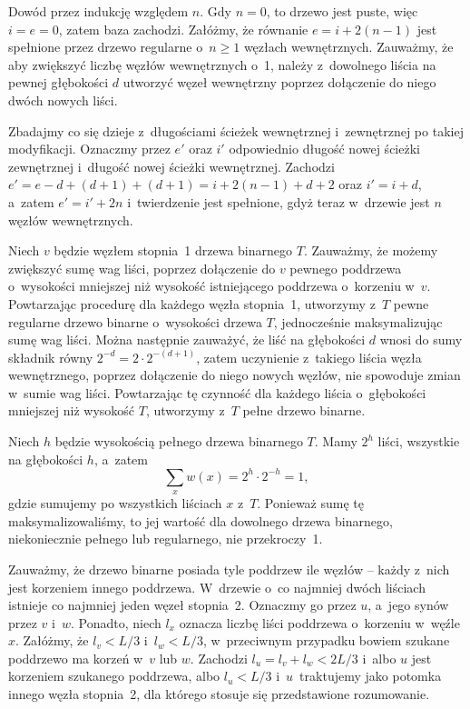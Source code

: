 \exercise %
Dowód przez indukcję względem $n$. Gdy $n=0$, to drzewo jest puste, więc $i=e=0$, zatem baza zachodzi. Załóżmy, że równanie $e=i+2(n-1)$ jest spełnione przez drzewo regularne o~$n\ge1$ węzłach wewnętrznych. Zauważmy, że aby zwiększyć liczbę węzłów wewnętrznych o~1, należy z~dowolnego liścia na pewnej głębokości $d$ utworzyć węzeł wewnętrzny poprzez dołączenie do niego dwóch nowych liści.

Zbadajmy co się dzieje z~długościami ścieżek wewnętrznej i~zewnętrznej po takiej modyfikacji. Oznaczmy przez $e'$ oraz $i'$ odpowiednio długość nowej ścieżki zewnętrznej i~długość nowej ścieżki wewnętrznej. Zachodzi $e'=e-d+(d+1)+(d+1)=i+2(n-1)+d+2$ oraz $i'=i+d$, a~zatem $e'=i'+2n$ i~twierdzenie jest spełnione, gdyż teraz w~drzewie jest $n$ węzłów wewnętrznych.

\exercise %
Niech $v$ będzie węzłem stopnia~1 drzewa binarnego $T$. Zauważmy, że możemy zwiększyć sumę wag liści, poprzez dołączenie do $v$ pewnego poddrzewa o~wysokości mniejszej niż wysokość istniejącego poddrzewa o~korzeniu w~$v$. Powtarzając procedurę dla każdego węzła stopnia~1, utworzymy z~$T$ pewne regularne drzewo binarne o~wysokości drzewa $T$, jednocześnie maksymalizując sumę wag liści. Można następnie zauważyć, że liść na głębokości $d$ wnosi do sumy składnik równy $2^{-d}=2\cdot2^{-(d+1)}$, zatem uczynienie z~takiego liścia węzła wewnętrznego, poprzez dołączenie do niego nowych węzłów, nie spowoduje zmian w~sumie wag liści. Powtarzając tę czynność dla każdego liścia o~głębokości mniejszej niż wysokość $T$, utworzymy z~$T$ pełne drzewo binarne.

Niech $h$ będzie wysokością pełnego drzewa binarnego $T$. Mamy $2^h$ liści, wszystkie na głębokości $h$, a~zatem
\[
	\sum_{x}w(x) = 2^h\cdot2^{-h} = 1,
\]
gdzie sumujemy po wszystkich liściach $x$ z~$T$. Ponieważ sumę tę maksymalizowaliśmy, to jej wartość dla dowolnego drzewa binarnego, niekoniecznie pełnego lub regularnego, nie przekroczy~1.

\exercise %

\noindent Zauważmy, że drzewo binarne posiada tyle poddrzew ile węzłów -- każdy z~nich jest korzeniem innego poddrzewa. W~drzewie o~co najmniej dwóch liściach istnieje co najmniej jeden węzeł stopnia~2. Oznaczmy go przez $u$, a~jego synów przez $v$ i~$w$. Ponadto, niech $l_x$ oznacza liczbę liści poddrzewa o~korzeniu w~węźle $x$. Załóżmy, że $l_v<L/3$ i~$l_w<L/3$, w~przeciwnym przypadku bowiem szukane poddrzewo ma korzeń w~$v$ lub $w$. Zachodzi $l_u=l_v+l_w<2L/3$ i~albo $u$ jest korzeniem szukanego poddrzewa, albo $l_u<L/3$ i~$u$~traktujemy jako potomka innego węzła stopnia~2, dla którego stosuje się przedstawione rozumowanie.

